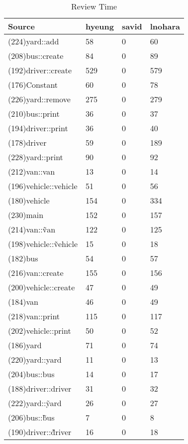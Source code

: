 \begin{table}[hb]
\begin{center}
\begin{tabular}{|l|l|l|l|}
\hline
Source & hyeung & savid & lnohara\\
\hline
(224)yard::add & 58 & 0 & 60\\
(208)bus::create & 84 & 0 & 89\\
(192)driver::create & 529 & 0 & 579\\
(176)Constant & 60 & 0 & 78\\
(226)yard::remove & 275 & 0 & 279\\
(210)bus::print & 36 & 0 & 37\\
(194)driver::print & 36 & 0 & 40\\
(178)driver & 59 & 0 & 189\\
(228)yard::print & 90 & 0 & 92\\
(212)van::van & 13 & 0 & 14\\
(196)vehicle::vehicle & 51 & 0 & 56\\
(180)vehicle & 154 & 0 & 334\\
(230)main & 152 & 0 & 157\\
(214)van::\~van & 122 & 0 & 125\\
(198)vehicle::\~vehicle & 15 & 0 & 18\\
(182)bus & 54 & 0 & 57\\
(216)van::create & 155 & 0 & 156\\
(200)vehicle::create & 47 & 0 & 49\\
(184)van & 46 & 0 & 49\\
(218)van::print & 115 & 0 & 117\\
(202)vehicle::print & 50 & 0 & 52\\
(186)yard & 71 & 0 & 74\\
(220)yard::yard & 11 & 0 & 13\\
(204)bus::bus & 14 & 0 & 17\\
(188)driver::driver & 31 & 0 & 32\\
(222)yard::\~yard & 26 & 0 & 27\\
(206)bus::\~bus & 7 & 0 & 8\\
(190)driver::\~driver & 16 & 0 & 18\\
\hline
\end{tabular}
\end{center}
\caption{Review Time}
\end{table}


